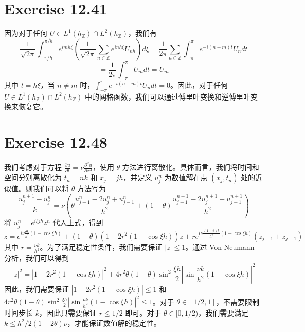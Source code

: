 \documentclass[twoside,a4paper]{article}
\begin{document}
\section{Exercise 12.41}
因为对于任何 $U\in L^1(h_{\mathbb{Z}})\cap L^2(h_{\mathbb{Z}})$，我们有
$$
\frac{1}{\sqrt{2\pi}}\int_{-\pi/h}^{\pi/h}e^{imh\xi}\left(\frac{1}{\sqrt{2\pi}}\sum_{n\in \mathbb{Z}}e^{inh\xi}U_{nh}\right)d\xi=\frac{1}{2\pi}\sum_{n\in \mathbb{Z}}\int_{-\pi}^\pi e^{-i(n-m)t}U_ndt
$$
$$
=\frac{1}{2\pi}\int_{-\pi}^\pi U_m dt= U_m
$$
其中 $t = h\xi$，当 $n \neq m$ 时，$\int_{-\pi}^\pi e^{-i(n - m)t}U_ndt = 0$。因此，对于任何 $U\in L^1(h_{\mathbb{Z}})\cap L^2(h_{\mathbb{Z}})$ 中的网格函数，我们可以通过傅里叶变换和逆傅里叶变换来恢复它。
\section{Exercise 12.48}
我们考虑对于方程 $\frac{\partial u}{\partial t}= \nu \frac{\partial^2 u}{\partial x^2}$，使用 $\theta$ 方法进行离散化。具体而言，我们将时间和空间分别离散化为 $t_n=nk$ 和 $x_j=jh$，并定义 $u_j^n$ 为数值解在点 $(x_j, t_n)$ 处的近似值。则我们可以将 $\theta$ 方法写为
$$
\frac{u_j^{n+1}-u_j^n}{k}=\nu\left(\theta \frac{u_{j+1}^n-2u_j^n+u_{j-1}^n}{h^2}+(1-\theta)\frac{u_{j+1}^{n+1}-2u_j^{n+1}+u_{j-1}^{n+1}}{h^2}\right)
$$
将 $u_j^n = e^{i\xi jh}z^n$ 代入上式，得到
$$
z=e^{i\nu \frac{\theta k}{h^2}(1-\cos\xi h)}+(1-\theta)\left(1-2r^2(1-\cos\xi h)\right)z+re^{i\nu \frac{(1-\theta)k}{h^2}(1-\cos\xi h)}(z_{j+1}+z_{j-1})
$$
其中 $r=\frac{\nu k}{h^2}$。为了满足稳定性条件，我们需要保证 $|z|\leq 1$。通过 Von Neumann 分析，我们可以得到
$$
|z|^2=\left|1-2r^2(1-\cos\xi h)\right|^2+4r^2\theta(1-\theta)\sin^2\frac{\xi h}{2}\left|\sin\frac{\nu k}{h^2}\left(1-\cos\xi h\right)\right|^2
$$
因此，我们需要保证 $|1-2r^2(1-\cos\xi h)|\leq 1$ 和 $4r^2\theta(1-\theta)\sin^2\frac{\xi h}{2}\left|\sin\frac{\nu k}{h^2}\left(1-\cos\xi h\right)\right|^2\leq 1$。对于 $\theta\in [1/2,1]$，不需要限制时间步长 $k$，因此只需要保证 $r\leq 1/2$ 即可。对于 $\theta\in [0,1/2)$，我们需要满足 $k\leq h^2/2(1-2\theta)\nu$，才能保证数值解的稳定性。
\end{document}
